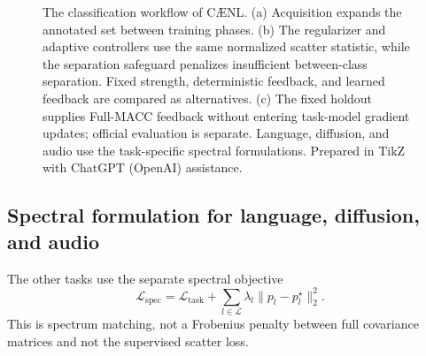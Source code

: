 \documentclass[a4paper,fleqn]{cas-dc}
\let\CAENLcaption\caption
\let\caption\CAENLcaption
\newcommand{\model}{C\AE{}NL}
\begin{document}
\begin{figure}[pos=p]
{%
}
\caption{The classification workflow of \model{}. (a) Acquisition expands the
annotated set between training phases. (b) The regularizer and adaptive
controllers use the same normalized scatter statistic, while the separation
safeguard penalizes insufficient between-class separation. Fixed strength, deterministic feedback, and learned feedback are
compared as alternatives. (c) The fixed holdout supplies Full-MACC feedback
without entering task-model gradient updates; official evaluation is separate.
Language, diffusion, and audio use the task-specific spectral formulations.
Prepared in TikZ with ChatGPT (OpenAI) assistance.}
\label{fig:detailed_workflow}\label{fig:framework_overview}
\end{figure}


\subsection{Spectral formulation for language, diffusion, and audio}
\label{sec:spectral}

The other tasks use the separate spectral objective
\begin{equation}
 \mathcal L_{\mathrm{spec}}=
 \mathcal L_{\mathrm{task}}+
 \sum_{l\in\mathcal L}\lambda_l\|p_l-p_l^\star\|_2^2.
 \label{eq:spectral}
\end{equation}
This is spectrum matching, not a Frobenius penalty between
full covariance matrices and not the supervised scatter loss.
\end{document}
